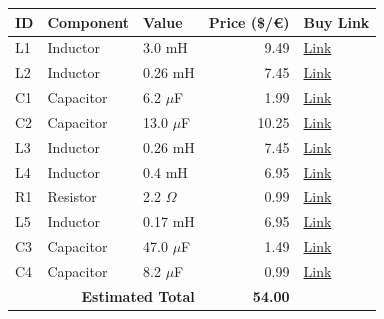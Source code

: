 \begin{table}[H]
    \centering
    \renewcommand{\arraystretch}{1.5}
    \begin{tabular}{@{}lllrl@{}}
        \toprule
        \textbf{ID} & \textbf{Component} & \textbf{Value} & \textbf{Price (\$/€)} & \textbf{Buy Link} \\
        \midrule
        L1 & Inductor & 3.0 mH & 9.49 & \href{https://www.parts-express.com/Dayton-Audio-IC183-3.0mH-18-AWG-Laminated-Iron-Core-Inductor-257-658}{Link} \\
        L2 & Inductor & 0.26 mH & 7.45 & \href{https://www.soundimports.eu/en/jantzen-audio-000-1728.html}{Link} \\
        C1 & Capacitor & 6.2 $\mu$F & 1.99 & \href{https://www.parts-express.com/Dayton-Audio-PMPC-6.2-6.2uF-250V-Precision-Audio-Capacitor-027-236}{Link} \\
        C2 & Capacitor & 13.0 $\mu$F & 10.25 & \href{https://www.soundimports.eu/en/audyn-q4-13-0-400.html}{Link} \\
        L3 & Inductor & 0.26 mH & 7.45 & \href{https://www.soundimports.eu/en/jantzen-audio-000-1728.html}{Link} \\
        L4 & Inductor & 0.4 mH & 6.95 & \href{https://www.soundimports.eu/en/dayton-audio-lw18-40.html}{Link} \\
        R1 & Resistor & 2.2 $\Omega$ & 0.99 & \href{https://www.soundimports.eu/en/jantzen-audio-002-0754.html}{Link} \\
        L5 & Inductor & 0.17 mH & 6.95 & \href{https://www.soundimports.eu/en/jantzen-audio-000-0822.html}{Link} \\
        C3 & Capacitor & 47.0 $\mu$F & 1.49 & \href{https://www.soundimports.eu/en/it-intertechnik-elcr-47-100.html}{Link} \\
        C4 & Capacitor & 8.2 $\mu$F & 0.99 & \href{https://www.soundimports.eu/en/it-intertechnik-elcr-8-2-100.html}{Link} \\
        \midrule
        \multicolumn{3}{r}{\textbf{Estimated Total}} & \textbf{54.00} & \\
        \bottomrule
    \end{tabular}
\end{table}
